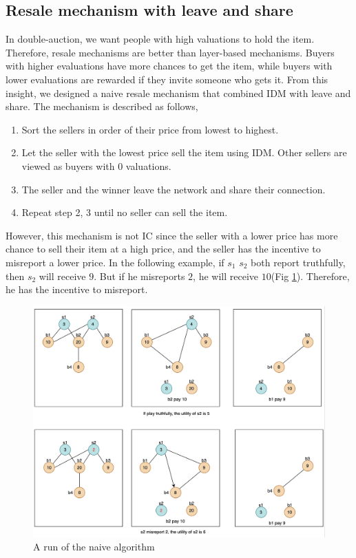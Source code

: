 \documentclass[format=acmsmall, review=false, natbib=false]{acmart}
\begin{document}
\subsection{Resale mechanism with leave and share}
In double-auction, we want people with high valuations to hold the item. Therefore, resale mechanisms are better than
layer-based mechanisms. Buyers with higher evaluations have more chances to get the item, while buyers with lower
evaluations are rewarded if they invite someone who gets it. From this insight, we designed a naive
resale mechanism that combined IDM with leave and share. The mechanism is described as follows,
\begin{tcolorbox}[title=Algorithm: Resale mechanism with Leave and Share - 1]
	\begin{enumerate}
		\item Sort the sellers in order of their price from lowest to highest.
		\item Let the seller with the lowest price sell the item using IDM. Other sellers are viewed as buyers with 0 valuations.
		\item The seller and the winner leave the network and share their connection.
		\item Repeat step 2, 3 until no seller can sell the item.
	\end{enumerate}
\end{tcolorbox}
However, this mechanism is not IC since the seller with a lower price has more chance to sell their
item at a high price, and the seller has the incentive to misreport a lower price. In the following example, if \(s_1\)
\(s_2\) both report truthfully, then \(s_2\) will receive \(9\). But
if he misreports \(2\), he will receive \(10\)(Fig \ref*{fig:IDMCounter1}). Therefore, he has the incentive to misreport.
\begin{figure}[htbp]
	\includegraphics[width=\textwidth]{image/IDMCounter1.png}
	\caption{A run of the naive algorithm}
	\label{fig:IDMCounter1}
\end{figure}
\end{document}
